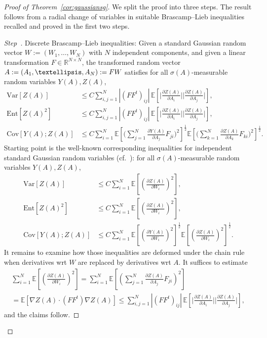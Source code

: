 \documentclass[11pt]{article}
\theoremstyle{definition}
\numberwithin{equation}{section}
\numberwithin{figure}{section}
\numberwithin{table}{section}
\newcommand{\R}{\mathbb R}
\newcommand{\E}{\mathbb{E}}
\newcommand{\expec}[1]{\mathbb{E}\left[#1 \right]}
\newcommand{\var}[1]{\mathrm{Var}\left[#1\right]}
\newcommand{\ent}[1]{\mathrm{Ent}\!\left[#1\right]}
\newcommand{\cov}[2]{\mathrm{Cov}\left[#1;#2\right]}
\newcounter{stepcount}
\newenvironment{step}{\refstepcounter{stepcount}\begin{proof}[Step~\thestepcount]}{\let\qed\relax\end{proof}}
\begin{document}
\begin{proof}[Proof of Theorem~\ref{cor:gaussiansg}]
We split the proof into three steps. The result follows from a radial change of variables in suitable Brascamp--Lieb inequalities recalled and proved in the first two steps.


\setcounter{stepcount}{0}
\begin{step}{Discrete Brascamp--Lieb inequalities:}\label{step1prooftheo3.1}
Given a standard Gaussian random vector $W:=(W_1,\ldots,W_N)$ with $N$ independent components, and given a linear transformation $F\in\R^{N\times N}$, the transformed random vector $A:=(A_1,\ldots,A_N)\linebreak:=FW$ satisfies for all $\sigma(A)$-measurable random variables $Y(A),Z(A)$,
\begin{equation}\label{eq:bl-var-disr}
\begin{aligned}
\var{Z(A)} &\le C\sum_{i,j=1}^N|(FF^t)_{ij}|\,\expec{\Big|\frac{\partial Z(A)}{\partial A_i}\Big|\Big|\frac{\partial Z(A)}{\partial A_j}\Big|},
\\
\ent{Z(A)^2} &\le C\sum_{i,j=1}^N|(FF^t)_{ij}|\,\expec{\Big|\frac{\partial Z(A)}{\partial A_i}\Big|\Big|\frac{\partial Z(A)}{\partial A_j}\Big|},\\
\cov{Y(A)}{Z(A)} &\le  C\sum_{i=1}^N\expec{\Big(\sum_{j=1}^N\frac{\partial{Y(A)}}{\partial A_j}F_{ji}\Big)^2}^\frac12\!\expec{\Big(\sum_{k=1}^N\frac{\partial{Z(A)}}{\partial A_k}F_{ki}\Big)^2}^\frac12.
\end{aligned}
\end{equation}
Starting point is the well-known corresponding inequalities for independent standard Gaussian random variables (cf.~\cite{Gross-75}): for all $\sigma(A)$-measurable random variables $Y(A),Z(A)$,
\begin{align*}
\var{Z(A)} &\le C\sum_{i=1}^N\expec{\left(\frac{\partial Z(A)}{\partial W_i}\right)^2},
\\
\ent{Z(A)^2} &\le C\sum_{i=1}^N\expec{\left(\frac{\partial Z(A)}{\partial W_i}\right)^2},
\\
\cov{Y(A)}{Z(A)} &\le C\sum_{i=1}^N\expec{\left(\frac{\partial{Y(A)}}{\partial W_i}\right)^2}^\frac12\!\expec{\left(\frac{\partial{Z(A)}}{\partial W_i}\right)^2}^\frac12.
\end{align*}
It remains to examine how those inequalities are deformed under the chain rule when derivatives wrt $W$ are replaced by derivatives wrt $A$. It suffices to estimate
\begin{multline*}
\sum_{i=1}^N\expec{\left(\frac{\partial{Z(A)}}{\partial W_i}\right)^2} = \sum_{i=1}^N\E\left[{\left(\sum_{j=1}^N\frac{\partial{Z(A)}}{\partial A_j}F_{ji} \right)^2}\right]\\
=\expec{\nabla Z(A)\cdot (FF^t)\nabla Z(A)} 
\le \sum_{i,j=1}^N|(FF^t)_{ij}|\,\expec{\Big|\frac{\partial{Z(A)}}{\partial A_i}\Big|\Big|\frac{\partial{Z(A)}}{\partial A_j}\Big|},
\end{multline*}
and the claims follow.
\end{step}


\end{proof}
\end{document}

